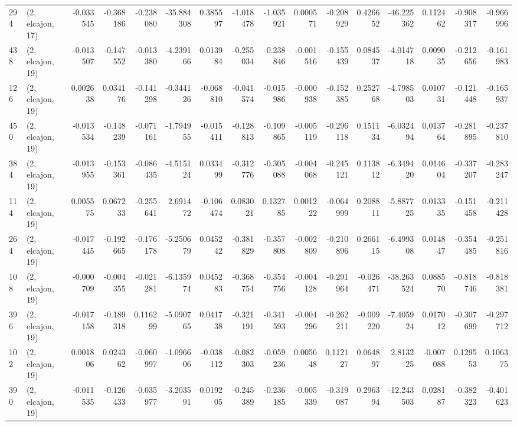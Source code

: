\begin{tabular}{llrrrrrrrrrrrrrr}
294 &  (2, elcajon, 17) &  -0.033545 & -0.368186 & -0.238080 &  -35.884308 &  0.385597 &  -1.018478 & -1.035921 &  0.000571 & -0.208929 &  0.426652 &  -46.225362 &  0.112462 & -0.908317 & -0.966996 \\
438 &  (2, elcajon, 19) &  -0.013507 & -0.147552 & -0.013380 &   -4.239166 &  0.013984 &  -0.255034 & -0.238846 & -0.001516 & -0.155439 &  0.084537 &   -4.014718 &  0.009035 & -0.212656 & -0.161983 \\
126 &  (2, elcajon, 19) &   0.002638 &  0.034176 & -0.141298 &   -0.344126 & -0.068810 &  -0.041574 & -0.015986 & -0.000938 & -0.152385 &  0.252768 &   -4.798503 &  0.010731 & -0.121448 & -0.165937 \\
450 &  (2, elcajon, 19) &  -0.013534 & -0.148239 & -0.071161 &   -1.794955 & -0.015411 &  -0.128813 & -0.109865 & -0.005119 & -0.296118 &  0.151134 &   -6.032494 &  0.013764 & -0.281895 & -0.237810 \\
384 &  (2, elcajon, 19) &  -0.013955 & -0.153361 & -0.086435 &   -4.515124 &  0.033499 &  -0.312776 & -0.305088 & -0.004068 & -0.245121 &  0.113812 &   -6.349420 &  0.014604 & -0.337207 & -0.283247 \\
114 &  (2, elcajon, 19) &   0.005575 &  0.067233 & -0.255641 &    2.691472 & -0.106474 &   0.083021 &  0.132785 &  0.001222 & -0.064999 &  0.208811 &   -5.887725 &  0.013335 & -0.151458 & -0.211428 \\
264 &  (2, elcajon, 19) &  -0.017445 & -0.192665 & -0.176178 &   -5.250679 &  0.045242 &  -0.381829 & -0.357808 & -0.002809 & -0.210896 &  0.266115 &   -6.499308 &  0.014847 & -0.354485 & -0.251816 \\
108 &  (2, elcajon, 19) &  -0.000709 & -0.004355 & -0.021281 &   -6.135974 &  0.045283 &  -0.368754 & -0.354756 & -0.004128 & -0.291964 & -0.026471 &  -38.263524 &  0.088570 & -0.818746 & -0.818381 \\
396 &  (2, elcajon, 19) &  -0.017158 & -0.189318 &  0.116299 &   -5.090765 &  0.041738 &  -0.321191 & -0.341593 & -0.004296 & -0.262211 & -0.009220 &   -7.405924 &  0.017012 & -0.307699 & -0.297712 \\
102 &  (2, elcajon, 19) &   0.001806 &  0.024362 & -0.060997 &   -1.096606 & -0.038112 &  -0.082303 & -0.059236 &  0.005648 &  0.112127 &  0.064897 &    2.813225 & -0.007088 &  0.129553 &  0.106375 \\
390 &  (2, elcajon, 19) &  -0.011535 & -0.126433 & -0.035977 &   -3.203591 &  0.019205 &  -0.245389 & -0.236185 & -0.005339 & -0.319087 &  0.296394 &  -12.243503 &  0.028187 & -0.382323 & -0.401623 \\

\end{tabular}
